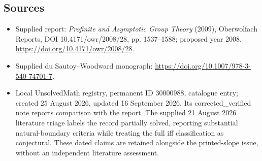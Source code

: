 \documentclass[11pt]{article}
\begin{document}
\subsection{Sources}
\begin{itemize}
\item Supplied report: \emph{Profinite and Asymptotic Group Theory} (2009), Oberwolfach Reports, DOI 10.4171/owr/2008/28, pp. 1537--1588; proposed year 2008. \url{https://doi.org/10.4171/owr/2008/28}.
\item Supplied du Sautoy--Woodward monograph: \url{https://doi.org/10.1007/978-3-540-74701-7}.
\item Local UnsolvedMath registry, permanent ID 30000988, catalogue entry; created 25 August 2026, updated 16 September 2026. Its corrected\_verified note reports comparison with the report. The supplied 21 August 2026 literature triage labels the record partially solved, reporting substantial natural-boundary criteria while treating the full iff classification as conjectural. These dated claims are retained alongside the printed-slope issue, without an independent literature assessment.
\end{itemize}
\end{document}
